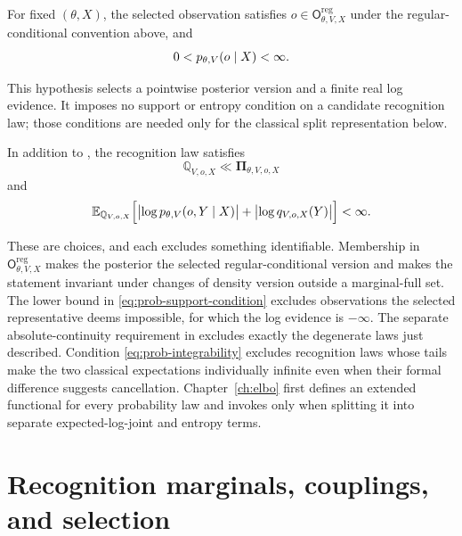 \medskip
{}
For fixed $(\theta,X)$, the selected observation satisfies $o\in\mathsf O_{\theta,V,X}^{\mathrm{reg}}$ under the regular-conditional convention above, and
\begin{equation}
0<p_{\theta,V}(o\mid X)<\infty.
\label{eq:prob-support-condition}
\end{equation}
\medskip

This hypothesis selects a pointwise posterior version and a finite real log evidence.  It imposes no support or entropy condition on a candidate recognition law; those conditions are needed only for the classical split representation below.

\medskip
{}
In addition to , the recognition law satisfies
\[
\mathbb Q_{V,o,X}\ll \boldsymbol\Pi_{\theta,V,o,X}
\]
and
\begin{equation}
\mathbb E_{\mathbb Q_{V,o,X}}\Bigl[\bigl|\log p_{\theta,V}(o,Y\mid X)\bigr|+\bigl|\log q_{V,o,X}(Y)\bigr|\Bigr]<\infty .
\label{eq:prob-integrability}
\end{equation}
\medskip

These are choices, and each excludes something identifiable. Membership in $\mathsf O_{\theta,V,X}^{\mathrm{reg}}$ makes the posterior the selected regular-conditional version and makes the statement invariant under changes of density version outside a marginal-full set. The lower bound in \eqref{eq:prob-support-condition} excludes observations the selected representative deems impossible, for which the log evidence is $-\infty$. The separate absolute-continuity requirement in  excludes exactly the degenerate laws just described. Condition \eqref{eq:prob-integrability} excludes recognition laws whose tails make the two classical expectations individually infinite even when their formal difference suggests cancellation.  Chapter~\ref{ch:elbo} first defines an extended functional for every probability law and invokes  only when splitting it into separate expected-log-joint and entropy terms.

\section{Recognition marginals, couplings, and selection}
\label{sec:prob-marginals}

